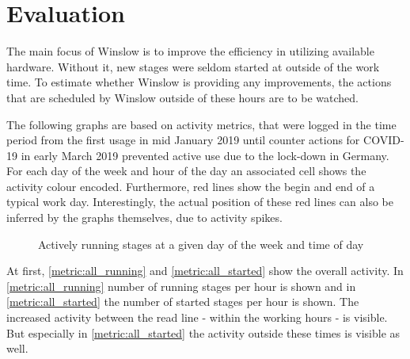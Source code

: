 \section{Evaluation}

The main focus of Winslow is to improve the efficiency in utilizing available hardware.
Without it, new stages were seldom started at outside of the work time.
To estimate whether Winslow is providing any improvements, the actions that are scheduled by Winslow outside of these hours are to be watched.

The following graphs are based on activity metrics, that were logged in the time period from the first usage in mid January 2019 until counter actions for COVID-19 in early March 2019 prevented active use due to the lock-down in Germany.
For each day of the week and hour of the day an associated cell shows the activity colour encoded.
Furthermore, red lines show the begin and end of a typical work day.
Interestingly, the actual position of these red lines can also be inferred by the graphs themselves, due to activity spikes.


\begin{figure}[H]
	\centering
	\caption{Actively running stages at a given day of the week and time of day}
	\label{metric:all_running}
\end{figure}

At first, \autoref{metric:all_running} and \autoref{metric:all_started} show the overall activity.
In \autoref{metric:all_running} number of running stages per hour is shown and in \autoref{metric:all_started} the number of started stages per hour is shown.
The increased activity between the read line - within the working hours - is visible.
But especially in \autoref{metric:all_started} the activity outside these times is visible as well.

